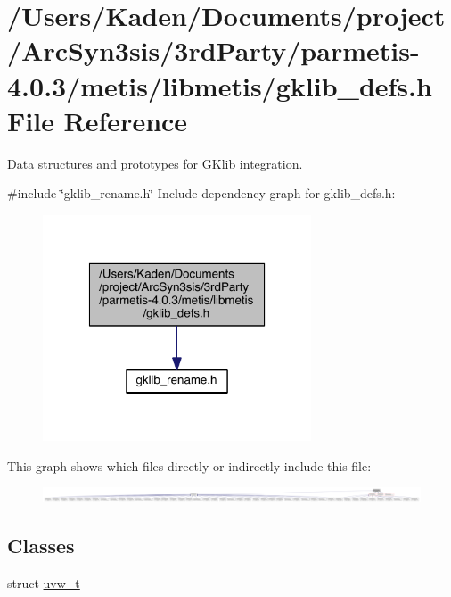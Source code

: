 \hypertarget{a00209}{}\section{/\+Users/\+Kaden/\+Documents/project/\+Arc\+Syn3sis/3rd\+Party/parmetis-\/4.0.3/metis/libmetis/gklib\+\_\+defs.h File Reference}
\label{a00209}


Data structures and prototypes for G\+Klib integration.  


{\ttfamily \#include \char`\"{}gklib\+\_\+rename.\+h\char`\"{}}\newline
Include dependency graph for gklib\+\_\+defs.\+h\+:\nopagebreak
\begin{figure}[H]
\begin{center}
\leavevmode
\includegraphics[width=226pt]{a00210}
\end{center}
\end{figure}
This graph shows which files directly or indirectly include this file\+:\nopagebreak
\begin{figure}[H]
\begin{center}
\leavevmode
\includegraphics[width=350pt]{a00211}
\end{center}
\end{figure}
\subsection*{Classes}
\begin{DoxyCompactItemize}
\item 
struct \hyperlink{a00710}{uvw\+\_\+t}
\end{DoxyCompactItemize}
